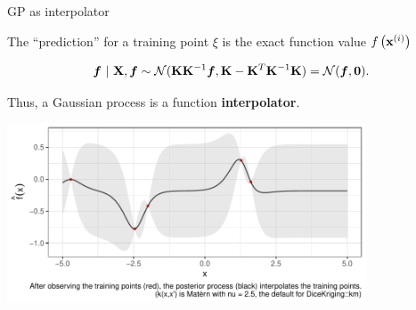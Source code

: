 \begin{vbframe}{GP as interpolator}

The \enquote{prediction} for a training point $\xi$ is the exact function value $f\left(\mathbf{x}^{(i)}\right)$

\vspace*{-0.8cm}

\begin{eqnarray*}
\bm{f} ~|~ \mathbf{X}, \bm{f} \sim \mathcal{N}(\mathbf{K}\mathbf{K}^{-1}\bm{f}, \mathbf{K} - \mathbf{K}^T \mathbf{K}^{-1} \mathbf{K}) = \mathcal{N}(\bm{f}, \bm{0}).
\end{eqnarray*}

Thus, a Gaussian process is a function \textbf{interpolator}.

\begin{center}
\includegraphics[width=0.8\textwidth]{figure/gp_pred/gp_interpolator.pdf}
\end{center}

\end{vbframe}



